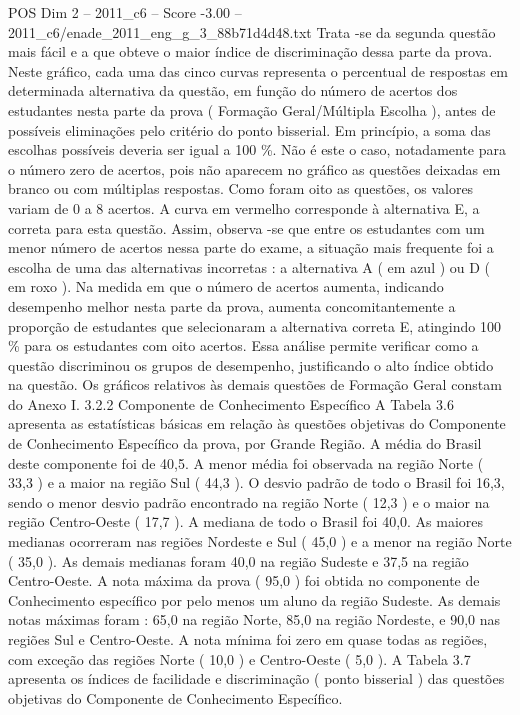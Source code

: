 \begin{textsample}{POS Dim 2 – 2011\_c6 – Score -3.00 – 2011\_c6/enade\_2011\_eng\_g\_3\_88b71d4d48.txt}
Trata -se da segunda questão mais fácil e a que obteve o maior índice de discriminação dessa parte da prova.
Neste gráfico, cada uma das cinco curvas representa o percentual de respostas em determinada alternativa da questão, em função do número de acertos dos estudantes nesta parte da prova ( Formação Geral/Múltipla Escolha ), antes de possíveis eliminações pelo critério do ponto bisserial.
Em princípio, a soma das escolhas possíveis deveria ser igual a 100 \%.
Não é este o caso, notadamente para o número zero de acertos, pois não aparecem no gráfico as questões deixadas em branco ou com múltiplas respostas.
Como foram oito as questões, os valores variam de 0 a 8 acertos.
A curva em vermelho corresponde à alternativa E, a correta para esta questão.
Assim, observa -se que entre os estudantes com um menor número de acertos nessa parte do exame, a situação mais frequente foi a escolha de uma das alternativas incorretas : a alternativa A ( em azul ) ou D ( em roxo ).
Na medida em que o número de acertos aumenta, indicando desempenho melhor nesta parte da prova, aumenta concomitantemente a proporção de estudantes que selecionaram a alternativa correta E, atingindo 100 \% para os estudantes com oito acertos.
Essa análise permite verificar como a questão discriminou os grupos de desempenho, justificando o alto índice obtido na questão.
Os gráficos relativos às demais questões de Formação Geral constam do Anexo I. 3.2.2 Componente de Conhecimento Específico A Tabela 3.6 apresenta as estatísticas básicas em relação às questões objetivas do Componente de Conhecimento Específico da prova, por Grande Região.
A média do Brasil deste componente foi de 40,5.
A menor média foi observada na região Norte ( 33,3 ) e a maior na região Sul ( 44,3 ).
O desvio padrão de todo o Brasil foi 16,3, sendo o menor desvio padrão encontrado na região Norte ( 12,3 ) e o maior na região Centro-Oeste ( 17,7 ).
A mediana de todo o Brasil foi 40,0.
As maiores medianas ocorreram nas regiões Nordeste e Sul ( 45,0 ) e a menor na região Norte ( 35,0 ).
As demais medianas foram 40,0 na região Sudeste e 37,5 na região Centro-Oeste.
A nota máxima da prova ( 95,0 ) foi obtida no componente de Conhecimento específico por pelo menos um aluno da região Sudeste.
As demais notas máximas foram : 65,0 na região Norte, 85,0 na região Nordeste, e 90,0 nas regiões Sul e Centro-Oeste.
A nota mínima foi zero em quase todas as regiões, com exceção das regiões Norte ( 10,0 ) e Centro-Oeste ( 5,0 ).
A Tabela 3.7 apresenta os índices de facilidade e discriminação ( ponto bisserial ) das questões objetivas do Componente de Conhecimento Específico.

\end{textsample}
